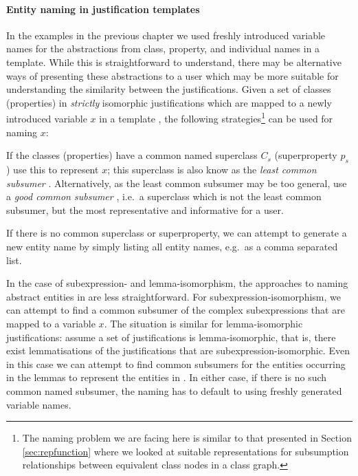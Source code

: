 \paragraph{Entity naming in justification templates}

In the examples in the previous chapter we used freshly introduced variable names for the abstractions from class, property, and individual names in a template. While this is straightforward to understand, there may be alternative ways of presenting these abstractions to a user which may be more suitable for understanding the similarity between the justifications. Given a set of classes (properties) in \emph{strictly} isomorphic justifications which are mapped to a newly introduced variable $x$ in a template \jtemplate, the following strategies\footnote{The naming problem we are facing here is similar to that presented in Section \ref{sec:repfunction} where we looked at suitable representations for subsumption relationships between equivalent class nodes in a class graph.} can be used for naming $x$:
\begin{compactenum}
\item If the classes (properties) have a common named superclass $C_{s}$ (superproperty $p_{s}$) use this to represent $x$; this superclass is also know as the \emph{least common subsumer} \cite{baader99aa}. Alternatively, as the least common subsumer may be too general, use a \emph{good common subsumer} \cite{baader07ab}, i.e.\ a superclass which is not the least common subsumer, but the most representative and informative for a user.
\item If there is no common superclass or superproperty, we can attempt to generate a new entity name by simply listing all entity names, e.g.\ as a comma separated list.
\end{compactenum}
In the case of subexpression- and lemma-isomorphism, the approaches to naming abstract entities in \jtemplate are less straightforward. For subexpression-isomorphism, we can attempt to find a common subsumer of the complex subexpressions that are mapped to a variable $x$. The situation is similar for lemma-isomorphic justifications: assume a set of justifications is lemma-isomorphic, that is, there exist lemmatisations of the justifications that are subexpression-isomorphic. Even in this case we can attempt to find common subsumers for the entities occurring in the lemmas to represent the entities in \jtemplate. In either case, if there is no such common named subsumer, the naming has to default to using freshly generated variable names.


